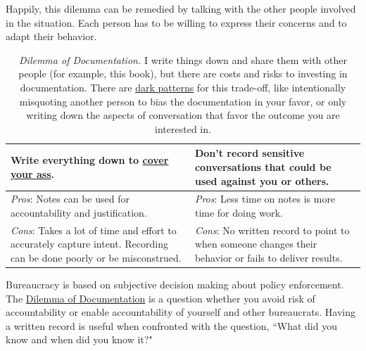 Happily, this dilemma can be remedied by talking with the other people involved in the situation. Each person has to be willing to express their concerns and to adapt their behavior. 

\begin{center}
\begin{table}[H] %
\begin{tabular}{ | m{\dilemmatablewidth}| m{\dilemmatablewidth} | } 
  \hline
  \textbf{Write everything down to \href{https://en.wikipedia.org/wiki/Cover_your_ass}{cover your ass}.
  \index{Wikipedia!\href{https://en.wikipedia.org/wiki/Cover_your_ass}{cover your ass}}
  } &
  \textbf{Don't record sensitive conversations that could be used against you or others.} \\
  \hline
  \textit{Pros}: Notes can be used for accountability and justification. &
  \textit{Pros}: Less time on notes is more time for doing work. \\
  \hline
  \textit{Cons}: Takes a lot of time and effort to accurately capture intent. Recording can be done poorly or be misconstrued.  & 
  \textit{Cons}: No written record to point to when someone changes their behavior or fails to deliver results. \\
  \hline
\end{tabular}
\caption{\textit{Dilemma of Documentation.}
I write things down and share them with other people (for example, this book), but there are costs and risks to investing in documentation. There are \href{https://en.wikipedia.org/wiki/Dark_pattern}{dark patterns}
for this trade-off, like intentionally misquoting another person to bias the documentation in your favor, or only writing down the aspects of conversation that favor the outcome you are interested in.  
}
\label{table:notes-or-no-notes}
\end{table}
\end{center}

Bureaucracy is based on subjective decision making about policy enforcement. The \hyperref[table:notes-or-no-notes]{Dilemma of Documentation} is a question whether you avoid risk of accountability or enable accountability of yourself and other bureaucrats. Having a written record is useful when confronted with the question, ``What did you know and when did you know it?"

